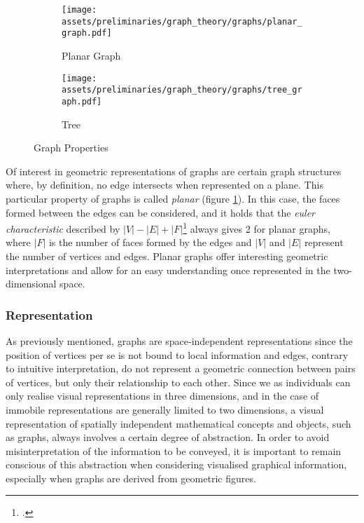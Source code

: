 \documentclass[a4paper, 12pt]{report}
\begin{document}
\begin{figure}
\centering
\begin{subfigure}{.5\textwidth}
\centering
\texttt{[image: assets/preliminaries/graph\_theory/graphs/planar\_graph.pdf]}
\caption{Planar Graph}
\label{fig:planar-graph}
\end{subfigure}%
\begin{subfigure}{.5\textwidth}
\centering
\texttt{[image: assets/preliminaries/graph\_theory/graphs/tree\_graph.pdf]}
\caption{Tree}
\label{fig:tree}
\end{subfigure}
\caption{Graph Properties}
\label{fig:graph-properties}
\end{figure}

Of interest in geometric representations of graphs are certain graph structures where, by definition, no edge intersects when represented on a plane. This particular property of graphs is called \textit{planar} (figure \ref{fig:planar-graph}). In this case, the faces formed between the edges can be considered, and it holds that the \textit{\Gls{euler characteristic}} described by \(|V| - |E| + |F| \)\footcite{dawes2013applications} always gives 2 for planar graphs, where $|F|$ is the number of faces formed by the edges and $|V|$ and $|E|$ represent the number of vertices and edges. Planar graphs offer interesting geometric interpretations and allow for an easy understanding once represented in the two-dimensional space.

\subsubsection{Representation}\label{subsec:representation}

As previously mentioned, graphs are space-independent representations since the position of vertices per se is not bound to local information and edges, contrary to intuitive interpretation, do not represent a geometric connection between pairs of vertices, but only their relationship to each other. Since we as individuals can only realise visual representations in three dimensions, and in the case of immobile representations are generally limited to two dimensions, a visual representation of spatially independent mathematical concepts and objects, such as graphs, always involves a certain degree of abstraction. In order to avoid misinterpretation of the information to be conveyed, it is important to remain conscious of this abstraction when considering visualised graphical information, especially when graphs are derived from geometric figures.
\end{document}
